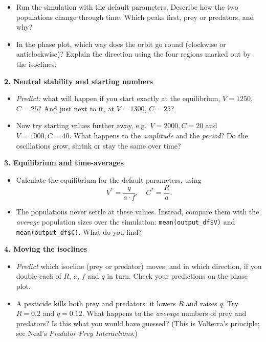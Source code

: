 \documentclass[
  a4paper]{book}
\providecommand{\tightlist}{%
  \setlength{\itemsep}{0pt}\setlength{\parskip}{0pt}}
\begin{document}
\begin{itemize}
\tightlist
\item
  Run the simulation with the default parameters. Describe how the two populations change through time. Which peaks first, prey or predators, and why?
\item
  In the phase plot, which way does the orbit go round (clockwise or anticlockwise)? Explain the direction using the four regions marked out by the isoclines.
\end{itemize}

\textbf{2. Neutral stability and starting numbers}

\begin{itemize}
\tightlist
\item
  \emph{Predict:} what will happen if you start exactly at the equilibrium, \(V = 1250\), \(C = 25\)? And just next to it, at \(V = 1300\), \(C = 25\)?
\item
  Now try starting values further away, e.g.~\(V = 2000, C = 20\) and \(V = 1000, C = 40\). What happens to the \emph{amplitude} and the \emph{period}? Do the oscillations grow, shrink or stay the same over time?
\end{itemize}

\textbf{3. Equilibrium and time-averages}

\begin{itemize}
\tightlist
\item
  Calculate the equilibrium for the default parameters, using
  \[
  V^* = \frac{q}{a \cdot f}, \quad C^* = \frac{R}{a}.
  \]
\item
  The populations never settle at these values. Instead, compare them with the \emph{average} population sizes over the simulation: \texttt{mean(output\_df\$V)} and \texttt{mean(output\_df\$C)}. What do you find?
\end{itemize}

\textbf{4. Moving the isoclines}

\begin{itemize}
\tightlist
\item
  \emph{Predict} which isocline (prey or predator) moves, and in which direction, if you double each of \(R\), \(a\), \(f\) and \(q\) in turn. Check your predictions on the phase plot.
\item
  A pesticide kills both prey and predators: it lowers \(R\) and raises \(q\). Try \(R = 0.2\) and \(q = 0.12\). What happens to the \emph{average} numbers of prey and predators? Is this what you would have guessed? (This is Volterra's principle; see Neal's \emph{Predator-Prey Interactions}.)
\end{itemize}
\end{document}
